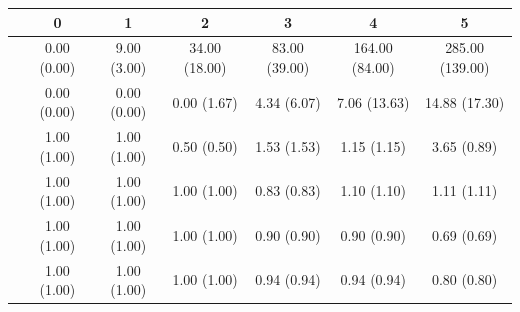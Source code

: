 \begin{table}[!t]
\begin{centering}
{\begin{centering}
\begin{tabular*}{1\columnwidth}{@{\extracolsep{\fill}}ccccccc}
\toprule 
\addlinespace[-0.17em]
{\scriptsize{}$m$\textbackslash{}$n$} & {\scriptsize{}0} & {\scriptsize{}1} & {\scriptsize{}2} & {\scriptsize{}3} & {\scriptsize{}4} & {\scriptsize{}5}\tabularnewline
\midrule
\addlinespace[-0.33em]
{\scriptsize{}0} & {\scriptsize{}0.00 (0.00)} & {\scriptsize{}9.00 (3.00)} & {\scriptsize{}34.00 (18.00)} & {\scriptsize{}83.00 (39.00)} & {\scriptsize{}164.00 (84.00)} & {\scriptsize{}285.00 (139.00)}\tabularnewline
\addlinespace[-0.33em]
{\scriptsize{}1} & {\scriptsize{}0.00 (0.00)} & {\scriptsize{}0.00 (0.00)} & {\scriptsize{}0.00 (1.67)} & {\scriptsize{}4.34 (6.07)} & {\scriptsize{}7.06 (13.63)} & {\scriptsize{}14.88 (17.30)}\tabularnewline
\addlinespace[-0.33em]
{\scriptsize{}2} & {\scriptsize{}1.00 (1.00)} & {\scriptsize{}1.00 (1.00)} & {\scriptsize{}0.50 (0.50)} & {\scriptsize{}1.53 (1.53)} & {\scriptsize{}1.15 (1.15)} & {\scriptsize{}3.65 (0.89)}\tabularnewline
\addlinespace[-0.33em]
{\scriptsize{}3} & {\scriptsize{}1.00 (1.00)} & {\scriptsize{}1.00 (1.00)} & {\scriptsize{}1.00 (1.00)} & {\scriptsize{}0.83 (0.83)} & {\scriptsize{}1.10 (1.10)} & {\scriptsize{}1.11 (1.11)}\tabularnewline
\addlinespace[-0.33em]
{\scriptsize{}4} & {\scriptsize{}1.00 (1.00)} & {\scriptsize{}1.00 (1.00)} & {\scriptsize{}1.00 (1.00)} & {\scriptsize{}0.90 (0.90)} & {\scriptsize{}0.90 (0.90)} & {\scriptsize{}0.69 (0.69)}\tabularnewline
\addlinespace[-0.33em]
{\scriptsize{}5} & {\scriptsize{}1.00 (1.00)} & {\scriptsize{}1.00 (1.00)} & {\scriptsize{}1.00 (1.00)} & {\scriptsize{}0.94 (0.94)} & {\scriptsize{}0.94 (0.94)} & {\scriptsize{}0.80 (0.80)}\tabularnewline
\bottomrule
\end{tabular*}
\par\end{centering}
}
\par\end{centering}
\begin{centering}
\end{centering}
\end{table}
